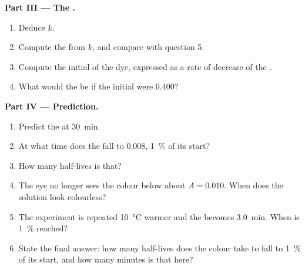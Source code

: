 \begin{problem}
\medskip
\noindent\textbf{Part III --- The .}
\begin{enumerate}[resume]
  \item Deduce $k$.
  \item Compute the  from $k$, and compare with question 5.
  \item Compute the initial  of the dye, expressed
        as a rate of decrease of the .
  \item What would the  be if the initial  were 0.400?
\end{enumerate}

\medskip
\noindent\textbf{Part IV --- Prediction.}
\begin{enumerate}[resume]
  \item Predict the  at \qty{30}{min}.
  \item At what time does the  fall to 0.008, \qty{1}{\percent}
        of its start?
  \item How many half-lives is that?
  \item The eye no longer sees the colour below about $A = 0.010$. When
        does the solution look colourless?
  \item The experiment is repeated \qty{10}{\celsius} warmer and the
         becomes \qty{3.0}{min}. When is \qty{1}{\percent}
        reached?
  \item State the final answer: how many half-lives does the colour take
        to fall to \qty{1}{\percent} of its start, and how many minutes is
        that here?
\end{enumerate}
\end{problem}
